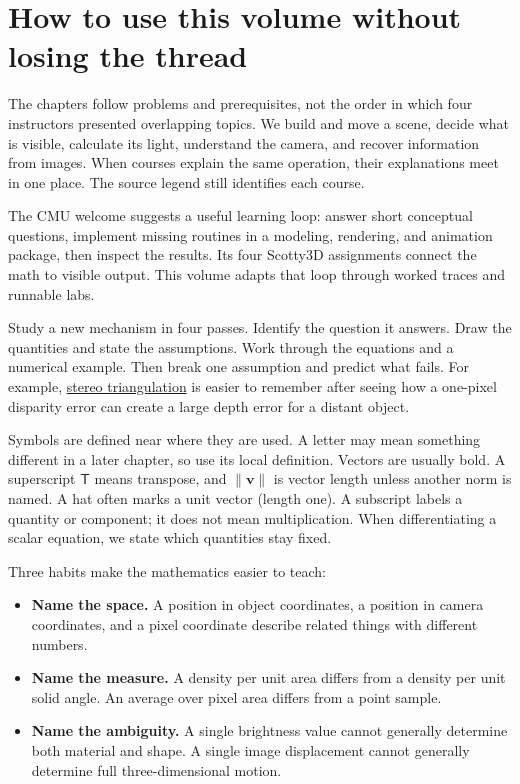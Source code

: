 \section{How to use this volume without losing the thread}\label{03-visual-computing-i-ch001-how-to-use-this-volume-without-losing-the-thread}

The chapters follow problems and prerequisites, not the order in which four instructors presented overlapping topics. We build and move a scene, decide what is visible, calculate its light, understand the camera, and recover information from images. When courses explain the same operation, their explanations meet in one place. The source legend still identifies each course.

The CMU welcome suggests a useful learning loop: answer short conceptual questions, implement missing routines in a modeling, rendering, and animation package, then inspect the results. Its four Scotty3D assignments connect the math to visible output. This volume adapts that loop through worked traces and runnable labs.

Study a new mechanism in four passes. Identify the question it answers. Draw the quantities and state the assumptions. Work through the equations and a numerical example. Then break one assumption and predict what fails. For example, \hyperref[appendix-c4e98b6e4001]{stereo triangulation} is easier to remember after seeing how a one-pixel disparity error can create a large depth error for a distant object.

Symbols are defined near where they are used. A letter may mean something different in a later chapter, so use its local definition. Vectors are usually bold. A superscript \(\mathsf T\) means transpose, and \(\|\mathbf v\|\) is vector length unless another norm is named. A hat often marks a unit vector (length one). A subscript labels a quantity or component; it does not mean multiplication. When differentiating a scalar equation, we state which quantities stay fixed.

Three habits make the mathematics easier to teach:

\begin{itemize}
\tightlist
\item
  \textbf{Name the space.} A position in object coordinates, a position in camera coordinates, and a pixel coordinate describe related things with different numbers.
\item
  \textbf{Name the measure.} A density per unit area differs from a density per unit solid angle. An average over pixel area differs from a point sample.
\item
  \textbf{Name the ambiguity.} A single brightness value cannot generally determine both material and shape. A single image displacement cannot generally determine full three-dimensional motion.
\end{itemize}

